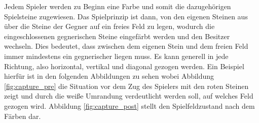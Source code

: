 \documentclass[12pt,a4paper,bibliography=totocnumbered,listof=totocnumbered]{article}
\begin{document}
Jedem Spieler werden zu Beginn eine Farbe und somit die dazugehörigen Spielsteine zugewiesen. Das Spielprinzip ist dann, von den eigenen Steinen aus über die Steine der Gegner auf ein freies Feld zu legen, wodurch die eingeschlossenen gegnerischen Steine eingefärbt werden und den Besitzer wechseln. Dies bedeutet, dass zwischen dem eigenen Stein und dem freien Feld immer mindestens ein gegnerischer liegen muss. Es kann generell in jede Richtung, also horizontal, vertikal und diagonal gezogen werden. Ein Beispiel hierfür ist in den folgenden Abbildungen zu sehen wobei Abbildung \ref{fig:capture_pre} die Situation vor dem Zug des Spielers mit den roten Steinen zeigt und durch die weiße Umrandung verdeutlicht werden soll, auf welches Feld gezogen wird. Abbildung \ref{fig:capture_post} stellt den Spielfeldzustand nach dem Färben dar.
\end{document}
